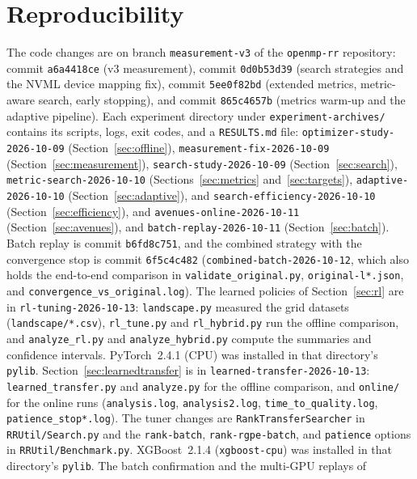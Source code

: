 \documentclass[10pt]{article}
\newcommand{\code}[1]{\texttt{#1}}
\begin{document}
\section{Reproducibility}
\label{sec:repro}

The code changes are on branch \code{measurement-v3} of the \code{openmp-rr}
repository: commit \code{a6a4418ce} (v3 measurement), commit \code{0d0b53d39}
(search strategies and the NVML device mapping fix), commit \code{5ee0f82bd}
(extended metrics, metric-aware search, early stopping), and commit
\code{865c4657b} (metrics warm-up and the adaptive pipeline). Each experiment directory
under \code{experiment-archives/} contains its scripts, logs, exit codes, and
a \code{RESULTS.md} file: \code{optimizer-study-2026-10-09}
(Section~\ref{sec:offline}), \code{measurement-fix-2026-10-09}
(Section~\ref{sec:measurement}), \code{search-study-2026-10-09}
(Section~\ref{sec:search}), \code{metric-search-2026-10-10}
(Sections~\ref{sec:metrics} and~\ref{sec:targets}),
\code{adaptive-2026-10-10} (Section~\ref{sec:adaptive}), and
\code{search-efficiency-2026-10-10} (Section~\ref{sec:efficiency}), and
\code{avenues-online-2026-10-11} (Section~\ref{sec:avenues}), and
\code{batch-replay-2026-10-11} (Section~\ref{sec:batch}). Batch replay is
commit \code{b6fd8c751}, and the combined strategy with the convergence stop is
commit \code{6f5c4c482} (\code{combined-batch-2026-10-12}, which also holds
the end-to-end comparison in \code{validate\_original.py},
\code{original-l*.json}, and \code{convergence\_vs\_original.log}).
The learned policies of Section~\ref{sec:rl} are in
\code{rl-tuning-2026-10-13}: \code{landscape.py} measured the
grid datasets (\code{landscape/*.csv}), \code{rl\_tune.py} and
\code{rl\_hybrid.py} run the offline comparison, and \code{analyze\_rl.py}
and \code{analyze\_hybrid.py} compute the summaries and confidence
intervals. PyTorch~2.4.1 (CPU) was installed in that directory's
\code{pylib}. Section~\ref{sec:learnedtransfer} is in
\code{learned-transfer-2026-10-13}: \code{learned\_transfer.py} and
\code{analyze.py} for the offline comparison, and \code{online/} for the
online runs (\code{analysis.log}, \code{analysis2.log},
\code{time\_to\_quality.log}, \code{patience\_stop*.log}). The tuner
changes are \code{RankTransferSearcher} in \code{RRUtil/Search.py} and the
\code{rank-batch}, \code{rank-rgpe-batch}, and \code{patience} options in
\code{RRUtil/Benchmark.py}. XGBoost~2.1.4 (\code{xgboost-cpu}) was installed
in that directory's \code{pylib}. The batch confirmation and the multi-GPU replays of
\end{document}
